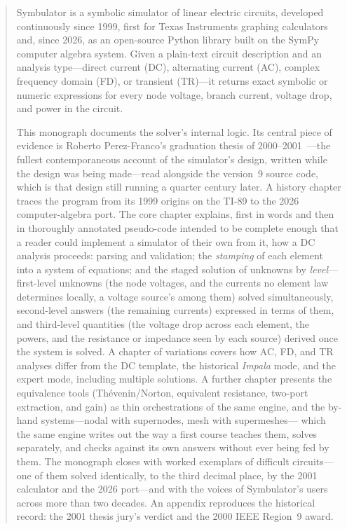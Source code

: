 \documentclass[11pt,oneside]{report}
\begin{document}
\begin{abstract}
\noindent
Symbulator is a symbolic simulator of linear electric circuits,
developed continuously since 1999, first for Texas Instruments
graphing calculators and, since 2026, as an open-source Python library
built on the SymPy computer algebra system. Given a plain-text circuit
description and an analysis type---direct current (DC), alternating
current (AC), complex frequency domain (FD), or transient (TR)---it
returns exact symbolic or numeric expressions for every node voltage,
branch current, voltage drop, and power in the circuit.

This monograph documents the solver's internal logic. Its central
piece of evidence is Roberto Perez-Franco's graduation thesis of
2000--2001~\cite{thesis2000}---the fullest contemporaneous account of
the simulator's design, written while the design was being made---read
alongside the version~9 source code, which is that design still
running a quarter century later. A history chapter traces the program
from its 1999 origins on the TI-89 to the 2026 computer-algebra port.
The core chapter explains, first in words and then in thoroughly
annotated pseudo-code intended to be complete enough that a reader
could implement a simulator of their own from it, how a DC analysis
proceeds: parsing and validation; the \emph{stamping} of each element
into a system of equations; and the staged solution of unknowns by
\emph{level}---first-level unknowns (the node voltages, and the
currents no element law determines locally, a voltage source's among
them) solved simultaneously, second-level answers (the remaining
currents) expressed in terms of them, and third-level quantities
(the voltage drop across each element, the powers, and the
resistance or impedance seen by each source) derived once the system
is solved. A
chapter of variations covers how AC, FD, and TR analyses differ from
the DC template, the historical \emph{Impala} mode, and the expert
mode, including multiple solutions. A further chapter presents the
equivalence tools (Th\'evenin/Norton, equivalent resistance, two-port
extraction, and gain) as thin orchestrations of the same engine, and
the by-hand systems---nodal with supernodes, mesh with supermeshes---%
which the same engine writes out the way a first course teaches them,
solves separately, and checks against its own answers without ever
being fed by them. The
monograph closes with worked exemplars of difficult circuits---one of
them solved identically, to the third decimal place, by the 2001
calculator and the 2026 port---and with the voices of Symbulator's
users across more than two decades. An appendix reproduces the
historical record: the 2001 thesis jury's verdict and the 2000 IEEE
Region~9 award.
\end{abstract}
\end{document}
